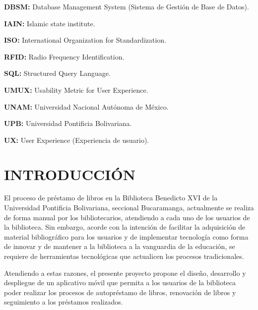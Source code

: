 \documentclass[spanish]{ieee_upb}
\begin{document}
\vspace{0.1cm}
\textbf{DBSM: } Database Management System (Sistema de Gestión de Base de Datos).

\vspace{0.1cm}
\textbf{IAIN: } Islamic state institute.

\vspace{0.1cm}
\textbf{ISO: } International Organization for Standardization.

\vspace{0.1cm}
\textbf{RFID: } Radio Frequency Identification.

\vspace{0.1cm}
\textbf{SQL: } Structured Query Language. 

\vspace{0.1cm}
\textbf{UMUX: } Usability Metric for User Experience.

\vspace{0.1cm}
\textbf{UNAM: } Universidad Nacional Autónoma de México.

\vspace{0.1cm}
\textbf{UPB: } Universidad Pontificia Bolivariana.

\vspace{0.1cm}
\textbf{UX: } User Experience (Experiencia de usuario).





\newpage
\section{INTRODUCCIÓN}
El proceso de préstamo de libros en la Biblioteca Benedicto XVI de la Universidad Pontificia Bolivariana, seccional Bucaramanga, actualmente se realiza de forma manual por los bibliotecarios, atendiendo a cada uno de los usuarios de la biblioteca. Sin embargo, acorde con la intención de facilitar la adquisición de material bibliográfico para los usuarios y de implementar tecnología como forma de innovar y de mantener a la biblioteca a la vanguardia de la educación, se requiere de herramientas tecnológicas que actualicen los procesos tradicionales.
\vspace{0.3 cm}

Atendiendo a estas razones, el presente proyecto propone el diseño, desarrollo y despliegue de un aplicativo móvil que permita a los usuarios de la biblioteca poder realizar los procesos de autopréstamo de libros, renovación de libros y seguimiento a los préstamos realizados.
\vspace{0.3 cm}
\end{document}
